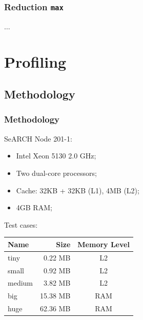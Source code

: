 \documentclass{beamer}
\begin{document}
\begin{frame}
	\frametitle{Reduction \texttt{max}}


\begin{center}
$\ldots$
\end{center}


\end{frame}






\section{Profiling}
\subsection{Methodology}
\begin{frame}
	\frametitle{Methodology}

	SeARCH Node 201-1:
	\begin{itemize}
		\item{Intel Xeon 5130 2.0 GHz;}
		\item{Two dual-core processors;}
		\item{Cache: 32KB + 32KB (L1), 4MB (L2);}
		\item{4GB RAM;}
	\end{itemize}
	
	Test cases:
	\begin{table}
		\begin{center}
			\begin{tabular}{|l|r|c|}
			\hline
\textbf{Name	}	&	\textbf{Size}	&	\textbf{Memory Level}	\\
			\hline
			\hline
tiny		&	0.22		MB	&	L2	\\
small	&	0.92		MB	&	L2	\\
medium	&	3.82		MB	&	L2	\\
big		&	15.38	MB	&	RAM	\\
huge		&	62.36	MB	&	RAM	\\
			\hline
			\end{tabular}
		\end{center}
	\end{table}

\end{frame}
\end{document}

